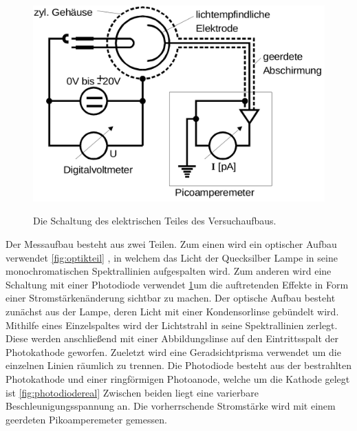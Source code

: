 \begin{figure}
	\centering
	\caption{Die Schaltung des elektrischen Teiles des Versuchaufbaus.}
	\includegraphics[width=\linewidth-150pt,height=\textheight-150pt,keepaspectratio]{content/Bilder/Elektrikteil.png}
	\label{fig:elektrikteil}
\end{figure}





Der Messaufbau besteht aus zwei Teilen. Zum einen wird ein optischer Aufbau verwendet \ref{fig:optikteil} ,
in welchem das Licht der Quecksilber Lampe in seine monochromatischen Spektrallinien
aufgespalten wird. Zum anderen wird eine Schaltung mit einer Photodiode verwendet \ref{fig:elektrikteil}um die auftretenden
Effekte in Form einer Stromstärkenänderung sichtbar zu machen. Der optische Aufbau
besteht zunächst aus der Lampe, deren Licht mit einer Kondensorlinse gebündelt wird.
 Mithilfe eines Einzelspaltes wird der Lichtstrahl in seine Spektrallinien zerlegt.
 Diese werden anschließend mit einer Abbildungslinse auf den Eintrittsspalt der
 Photokathode geworfen. Zueletzt wird eine Geradsichtprisma verwendet um die
 einzelnen Linien räumlich zu trennen. Die Photodiode besteht aus der bestrahlten
 Photokathode und einer ringförmigen Photoanode, welche um die Kathode gelegt ist \ref{fig:photodiodereal}
 Zwischen beiden liegt eine varierbare Beschleunigungsspannung an. Die vorherrschende
 Stromstärke wird mit einem geerdeten Pikoamperemeter gemessen.
